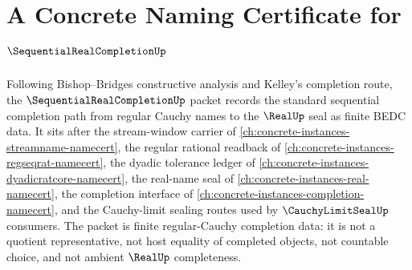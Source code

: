 \chapter{A Concrete Naming Certificate for $\SequentialRealCompletionUp$}
\label{ch:concrete-instances-sequential-real-completion-namecert}

Following Bishop--Bridges constructive analysis and Kelley's completion route, the $\SequentialRealCompletionUp$ packet records the standard sequential completion path from regular Cauchy names to the $\RealUp$ seal as finite BEDC data. It sits after the stream-window carrier of \autoref{ch:concrete-instances-streamname-namecert}, the regular rational readback of \autoref{ch:concrete-instances-regseqrat-namecert}, the dyadic tolerance ledger of \autoref{ch:concrete-instances-dyadicratcore-namecert}, the real-name seal of \autoref{ch:concrete-instances-real-namecert}, the completion interface of \autoref{ch:concrete-instances-completion-namecert}, and the Cauchy-limit sealing routes used by $\CauchyLimitSealUp$ consumers. The packet is finite regular-Cauchy completion data: it is not a quotient representative, not host equality of completed objects, not countable choice, and not ambient $\RealUp$ completeness.

